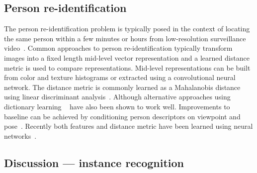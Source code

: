     \subsection{Person re-identification}
        The person re-identification problem is typically posed in the context of locating the same person within a
        few minutes or hours from low-resolution surveillance
        video~\cite{hirzer_relaxed_2012,karanam_person_2015,wu_viewpoint_2015,shi_embedding_2016}. Common
        approaches to person re-identification typically transform images into a fixed length mid-level vector
        representation and a learned distance metric is used to compare representations. Mid-level representations
        can be built from color and texture histograms or extracted using a convolutional neural network. The
        distance metric is commonly learned as a Mahalanobis distance using linear discriminant
        analysis~\cite{hirzer_relaxed_2012}. Although alternative approaches using dictionary learning
        ~\cite{karanam_person_2015} have also been shown to work well. Improvements to baseline can be achieved by
        conditioning person descriptors on viewpoint and pose~\cite{wu_viewpoint_2015}. Recently both features and
        distance metric have been learned using neural networks~\cite{shi_embedding_2016}.

    \subsection{Discussion --- instance recognition}

